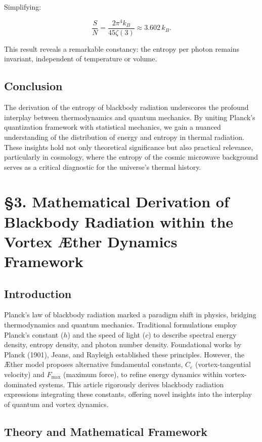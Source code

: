 \documentclass[a4paper,10pt]{article}
\begin{document}
 Simplifying:

 \begin{equation*}
  \frac{S}{N} = \frac{2 \pi^4 k_B}{45 \zeta(3)} \approx 3.602 \, k_B.
 \end{equation*}

 This result reveals a remarkable constancy: the entropy per photon remains invariant, independent of temperature or volume.

 \subsection*{Conclusion}
 The derivation of the entropy of blackbody radiation underscores the profound interplay between thermodynamics and quantum mechanics. By uniting Planck's quantization framework with statistical mechanics, we gain a nuanced understanding of the distribution of energy and entropy in thermal radiation. These insights hold not only theoretical significance but also practical relevance, particularly in cosmology, where the entropy of the cosmic microwave background serves as a critical diagnostic for the universe's thermal history.



  \section*{§3. Mathematical Derivation of Blackbody Radiation within the Vortex Æther Dynamics Framework}

  \subsection*{Introduction}
  Planck's law of blackbody radiation marked a paradigm shift in physics, bridging thermodynamics and quantum mechanics. Traditional formulations employ Planck's constant ($h$) and the speed of light ($c$) to describe spectral energy density, entropy density, and photon number density. Foundational works by Planck (1901), Jeans, and Rayleigh established these principles. However, the Æther model proposes alternative fundamental constants, $C_e$ (vortex-tangential velocity) and $ F_{\max} $ (maximum force), to refine energy dynamics within vortex-dominated systems. This article rigorously derives blackbody radiation expressions integrating these constants, offering novel insights into the interplay of quantum and vortex dynamics.

  \subsection*{Theory and Mathematical Framework}
\end{document}
